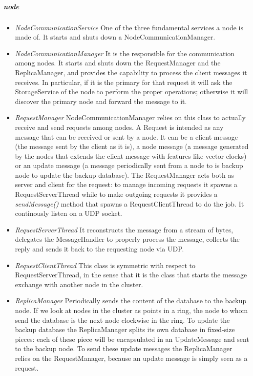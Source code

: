 \documentclass{article}
\begin{document}
\subparagraph{node} 
\begin{itemize}
\item \textit{NodeCommunicationService} One of the three fundamental services a node is made of. It starts and shuts down a NodeCommunicationManager.
\item \textit{NodeCommunicationManager} It is the responsible for the communication among nodes. It starts and shuts down the RequestManager and the ReplicaManager, and provides the capability to process the client messages it receives. In particular, if it is the primary for that request it will ask the StorageService of the node to perform the proper operations; otherwise it will discover the primary node and forward the message to it.
\item \textit{RequestManager} NodeCommunicationManager relies on this class to actually receive and send requests among nodes. A Request is intended as any message that can be received or sent by a node. It can be a client message (the message sent by the client as it is), a node message (a message generated by the nodes that extends the client message with features like vector clocks) or an update message (a message periodically sent from a node to is backup node to update the backup database). The RequestManager acts both as server and client for the request: to manage incoming requests it spawns a RequestServerThread while to make outgoing requests it provides a \textit{sendMessage()} method that spawns a RequestClientThread to do the job. It continously listen on a UDP socket.
\item \textit{RequestServerThread} It reconstructs the message from a stream of bytes, delegates the MessageHandler to properly process the message, collects the reply and sends it back to the requesting node via UDP.
\item \textit{RequestClientThread} This class is symmetric with respect to RequestServerThread, in the sense that it is the class that starts the message exchange with another node in the cluster.
\item \textit{ReplicaManager} Periodically sends the content of the database to the backup node. If we look at nodes in the cluster as points in a ring, the node to whom send the database is the next node clockwise in the ring. To update the backup database the ReplicaManager splits its own database in fixed-size pieces: each of these piece will be encapsulated in an UpdateMessage and sent to the backup node. To send these update messages the ReplicaManager relies on the RequestManager, because an update message is simply seen as a request.
\end{itemize}
\end{document}
